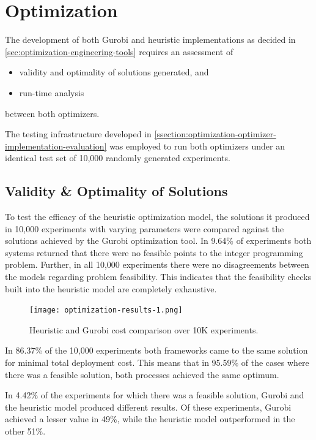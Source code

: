 \documentclass[../mthe-493-final-project.tex]{subfiles}
\begin{document}
    \section{Optimization}
    
    The development of both Gurobi and heuristic implementations as decided in \autoref{sec:optimization-engineering-tools} requires an assessment of
    \begin{itemize}
        \item validity and optimality of solutions generated, and
        \item run-time analysis
    \end{itemize}
    between both optimizers.
    
    The testing infrastructure developed in \autoref{ssection:optimization-optimizer-implementation-evaluation} was employed to run both optimizers under an identical test set of 10,000 randomly generated experiments.
    
    \subsection{Validity \& Optimality of Solutions}
    
    To test the efficacy of the heuristic optimization model, the solutions it produced in 10,000 experiments with varying parameters were compared against the solutions achieved by the Gurobi optimization tool. In 9.64\% of experiments both systems returned that there were no feasible points to the integer programming problem. Further, in all 10,000 experiments there were no disagreements between the models regarding problem feasibility. This indicates that the feasibility checks built into the heuristic model are completely exhaustive.
    
    
    \begin{figure}
        \centering
        \texttt{[image: optimization-results-1.png]}
        \caption{Heuristic and Gurobi cost comparison over 10K experiments.}
        \label{fig:optimization-results-1}
    \end{figure}
    
    In 86.37\% of the 10,000 experiments both frameworks came to the same solution for minimal total deployment cost. This means that in 95.59\% of the cases where there was a feasible solution, both processes achieved the same optimum.
    
    In 4.42\% of the experiments for which there was a feasible solution, Gurobi and the heuristic model produced different results. Of these experiments, Gurobi achieved a lesser value in 49\%, while the heuristic model outperformed in the other 51\%.
    
\end{document}
